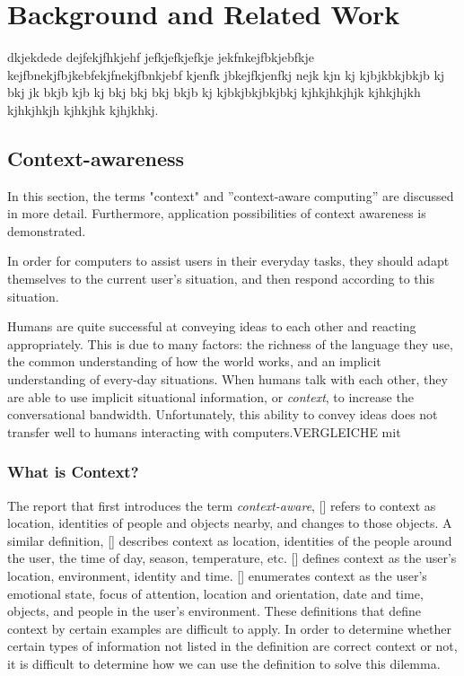 \chapter{Background and Related Work\label{cha:chapter2}}
dkjekdede dejfekjfhkjehf jefkjefkjefkje jekfnkejfbkjebfkje kejfbnekjfbjkebfekjfnekjfbnkjebf kjenfk jbkejfkjenfkj nejk kjn kj kjbjkbkjbkjb kj bkj jk bkjb kjb kj bkj bkj bkj bkjb kj  kjbkjbkjbkjbkj
kjhkjhkjhjk kjhkjhjkh kjhkjhkjh kjhkjhk kjhjkhkj.

\section{Context-awareness\label{sec:back_con_aw}}
In this section, the terms "context" and ''context-aware computing'' are discussed in more detail. Furthermore, application possibilities of context awareness is demonstrated.

In order for computers to assist users in their everyday tasks, they should adapt themselves to the current user's situation, and then respond according to this situation. 

Humans are quite successful at conveying ideas to each other and reacting appropriately. This is due to many factors: the richness of the language they use, the common understanding of how the world works, and an implicit understanding of every-day situations. When humans talk with each other, they are able to use implicit situational information, or \emph{context}, to increase the conversational bandwidth. Unfortunately, this ability to convey ideas does not transfer well to humans interacting with computers.VERGLEICHE mit\citeauthor{Dey2000b}

\subsection{What is Context?}

The report that first introduces the term \emph{context-aware}, [\citeauthor{ieee313011}] refers to context as location, identities of people and objects nearby, and changes to those objects. A similar definition, [\citeauthor{ieee626984}] describes context as location, identities of the people around the user, the time of day, season, temperature, etc. [\citeauthor{Ryan97}] defines context as the user's location, environment, identity and time. [\citeauthor{Dey98}] enumerates context as the user's emotional state, focus of attention, location and orientation, date and time, objects, and people in the user's environment. These definitions that define context by certain examples are difficult to apply. In order to determine whether certain types of information not listed in the definition are correct context or not, it is difficult to determine how we can use the definition to solve this dilemma.


